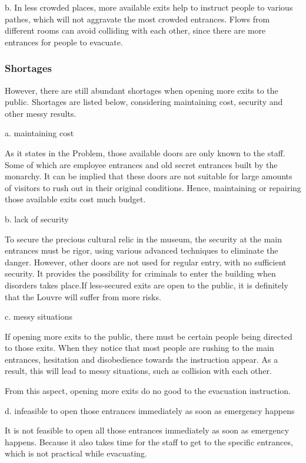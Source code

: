\documentclass{mcmthesis}
\begin{document}
b. In less crowded places, more available exits help to instruct people to various pathes, which will not aggravate the most crowded entrances. Flows from different rooms can avoid colliding with each other, since there are more entrances for people to evacuate.

\subsubsection{Shortages}

However, there are still abundant shortages when opening more exits to the public. Shortages are listed below, considering maintaining cost, security and other messy results.

a. maintaining cost

As it states in the Problem, those available doors are only known to the staff. Some of which are employee entrances and old secret entrances built by the monarchy. It can be implied that these doors are not suitable for large amounts of visitors to rush out in their original conditions. Hence, maintaining or repairing those available exits cost much budget.

b. lack of security

To secure the precious cultural relic in the museum, the security at the main entrances must be rigor, using various advanced techniques to eliminate the danger. However, other doors are not used for regular entry, with no sufficient security. It provides the possibility for criminals to enter the building when disorders takes place.If less-secured exits are open to the public, it is definitely that the Louvre will suffer from more risks.

c. messy situations

If opening more exits to the public, there must be certain people being directed to those exits. When they notice that most people are rushing to the main entrances, hesitation and disobedience towards the instruction appear. As a result, this will lead to messy situations, such as collision with each other.

From this aspect, opening more exits do no good to the evacuation instruction.

d. infeasible to open those entrances immediately as soon as emergency happens

It is not feasible to open all those entrances immediately as soon as emergency happens. Because it also takes time for the staff to get to the specific entrances, which is not practical while evacuating.
\end{document}
